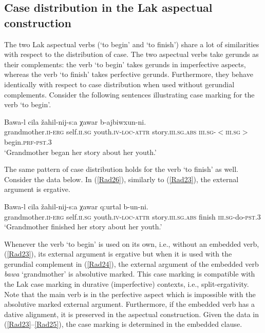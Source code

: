 \documentclass[output=paper]{langscibook}
\begin{document}
\subsection{Case distribution in the Lak aspectual construction}

The two Lak aspectual verbs (‘to begin’ and ‘to finish’) share a lot of similarities with respect to the distribution of case. The two aspectual verbs take gerunds as their complements: the verb ‘to begin’ takes gerunds in imperfective aspects, whereas the verb ‘to finish’ takes perfective gerunds. Furthermore, they behave identically with respect to case distribution when used without gerundial complements. Consider the following sentences illustrating case marking for the verb ‘to begin’.

\ea\label{Rad23}
\gll Bawa-l cila žahil-nij-s:a χawar b-ajbiwxun-ni.\\ 
grandmother.\textsc{ii-erg} self.\textsc{ii.sg} youth.\textsc{iv-loc-attr} story.\textsc{iii.sg.abs} 
\textsc{iii.sg-$<$iii.sg$>$}begin.\textsc{prf-pst.3}\\
\glt ‘Grandmother began her story about her youth.’
\z

The same pattern of case distribution holds for the verb ‘to finish’ as well. Consider the data below. In (\ref{Rad26}), similarly to (\ref{Rad23}), the external argument is ergative.

\ea\label{Rad26}
\gll Bawa-l cila žahil-nij-s:a χawar q:urtal b-un-ni.\\ 	
grandmother.\textsc{ii-erg} self.\textsc{ii.sg} youth.\textsc{iv-loc-attr} story.\textsc{iii.sg.abs}	finish \textsc{iii.sg}-do-\textsc{pst.3}\\ 
\glt ‘Grandmother finished her story about her youth.’
\z

Whenever the verb ‘to begin’ is used on its own, i.e., without an embedded verb, (\ref{Rad23}), its external argument is ergative but when it is used with the gerundial complement in (\ref{Rad24}), the external argument of the embedded verb \textit{bawa} ‘grandmother’ is absolutive marked. This case marking is compatible with the Lak case marking in durative (imperfective) contexts, i.e., split-ergativity. Note that the main verb is in the perfective aspect which is impossible with the absolutive marked external argument. Furthermore, if the embedded verb has a dative alignment, it is preserved in the aspectual construction. Given the data in (\ref{Rad23}--\ref{Rad25}), the case marking is determined in the embedded clause.
\end{document}
